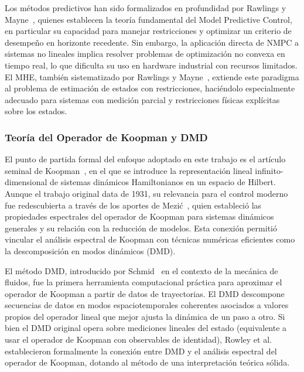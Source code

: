 \documentclass[12pt,letterpaper]{article}
\begin{document}
Los métodos predictivos han sido formalizados en profundidad por
Rawlings y Mayne~\cite{rawlings2009}, quienes establecen la teoría fundamental del
Model Predictive Control, en particular su capacidad para manejar restricciones y
optimizar un criterio de desempeño en horizonte recedente. Sin embargo, la aplicación
directa de NMPC a sistemas no lineales implica resolver problemas de optimización no
convexa en tiempo real, lo que dificulta su uso en hardware industrial con recursos
limitados. El MHE, también sistematizado por
Rawlings y Mayne~\cite{rawlings2009}, extiende este paradigma al problema de
estimación de estados con restricciones, haciéndolo especialmente adecuado para
sistemas con medición parcial y restricciones físicas explícitas sobre los estados.

\subsubsection*{Teoría del Operador de Koopman y DMD}

El punto de partida formal del enfoque adoptado en este trabajo es el artículo
seminal de Koopman~\cite{koopman1931}, en el que se introduce la representación
lineal infinito-dimensional de sistemas dinámicos Hamiltonianos en un espacio de
Hilbert. Aunque el trabajo original data de 1931, su relevancia para el control
moderno fue redescubierta a través de los aportes de Mezi\'c~\cite{mezic2005}, quien
estableció las propiedades espectrales del operador de Koopman para sistemas
dinámicos generales y su relación con la reducción de modelos. Esta conexión permitió
vincular el análisis espectral de Koopman con técnicas numéricas eficientes como la
descomposición en modos dinámicos (DMD).

El método DMD, introducido por Schmid~\cite{schmid2010} en el contexto de la
mecánica de fluidos, fue la primera herramienta computacional práctica para
aproximar el operador de Koopman a partir de datos de trayectorias. El DMD descompone
secuencias de datos en modos espaciotemporales coherentes asociados a valores propios
del operador lineal que mejor ajusta la dinámica de un paso a otro. Si bien el DMD
original opera sobre mediciones lineales del estado (equivalente a usar el operador
de Koopman con observables de identidad), Rowley et al.~\cite{rowley2009}
establecieron formalmente la conexión entre DMD y el análisis espectral del operador
de Koopman, dotando al método de una interpretación teórica sólida.
\end{document}
